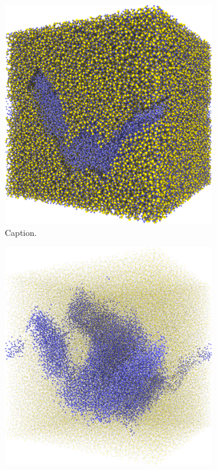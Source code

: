 %
\begin{figure}[htpb]%
    \centering%
    \setlength{\myfigwidth}{0.49\textwidth}%
%
    \begin{subfigure}[b]{\myfigwidth}%
        \centering%
        \includegraphics[width=\textwidth]{images/systems/trimmed-rough_fracture03_06}%
        \caption{Caption.}%
    \end{subfigure}%
    \hfill%
    \begin{subfigure}[b]{\myfigwidth}%
        \centering%
        \includegraphics[width=\textwidth]{images/systems/trimmed-rough_fracture03_05}%

\end{subfigure}
\end{figure}
